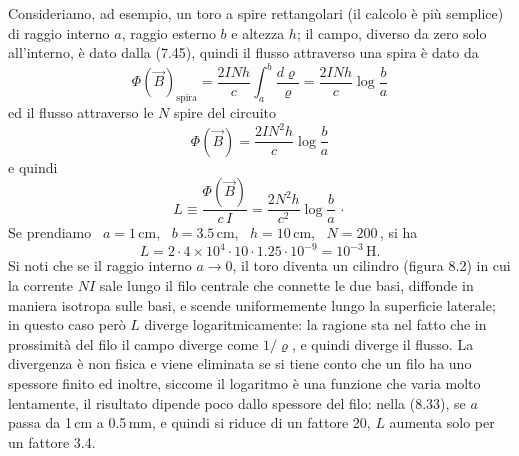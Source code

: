 Consideriamo, ad esempio, un toro a spire rettangolari (il calcolo \`e pi\`u
semplice) di raggio interno $a$, raggio esterno $b$ e altezza $h$; il campo,
diverso da zero solo all'interno, \`e dato dalla (7.45), quindi il flusso
attraverso una spira \`e dato da
\begin{equation}
  \Phi(\vec B)_\mathrm{spira}=\frac{2INh}{c}\int_a^b\frac{d\varrho}{\varrho}
  =\frac{2INh}{c}\log\frac{b}{a}
  \tag{8.30}
\end{equation}
ed il flusso attraverso le $N$ spire del circuito
\begin{equation}
  \Phi(\vec B)=\frac{2IN^2h}{c}\log\frac{b}{a}
  \tag{8.31}
\end{equation}
e quindi
\begin{equation}
  L\equiv\frac{\Phi(\vec B)}{c\,I}=\frac{2N^2h}{c^2}\log\frac{b}{a}\,\cdot
  \tag{8.32}
\end{equation}
Se prendiamo \ $a=1$\,cm, \ $b=3.5$\,cm, \ $h=10$\,cm, \ $N=200$\,, si ha
\begin{equation}
  L=2\cdot4\times10^4\cdot10\cdot1.25\cdot10^{-9}=10^{-3}\,\mathrm{H}.
  \tag{8.33}
\end{equation}
Si noti che se il raggio interno $a\to0$, il toro diventa un cilindro (figura
8.2) in cui la corrente $NI$ sale lungo il filo centrale che connette le due
basi, diffonde in maniera isotropa sulle basi, e scende uniformemente lungo la
superficie laterale; in questo caso per\`o $L$ diverge logaritmicamente: la
ragione sta nel fatto che in prossimit\`a del filo il campo diverge come
$1/\varrho$, e quindi diverge il flusso.
La divergenza \`e non fisica e viene eliminata se si tiene conto che un filo ha
uno spessore finito ed inoltre, siccome il logaritmo \`e una funzione che varia
molto lentamente, il risultato dipende poco dallo spessore del filo: nella
(8.33), se $a$ passa da 1\,cm a 0.5\,mm, e quindi si riduce di un fattore 20,
$L$ aumenta solo per un fattore 3.4.

